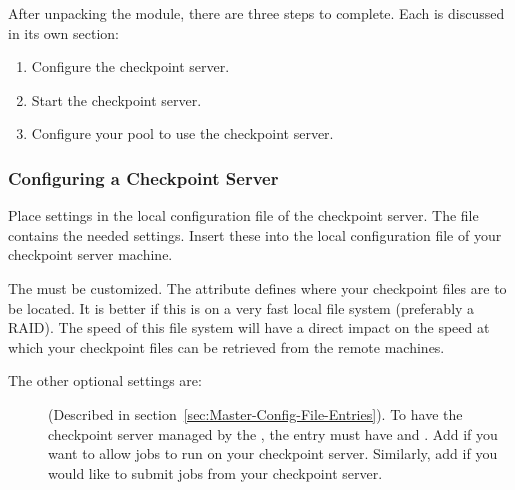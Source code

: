 After unpacking the module, there are three steps
to complete.
Each is discussed in its own section:
\begin{enumerate}
\item Configure the checkpoint server.
\item Start the checkpoint server.
\item Configure your pool to use the checkpoint server.
\end{enumerate}

\subsubsection{\label{sec:Configure-Ckpt-Server}
Configuring a Checkpoint Server} 

Place settings in the local configuration file of
the checkpoint server.
The file  contains
the needed settings. Insert these into the local
configuration file of your checkpoint server machine. 

The   
must be customized.
The  attribute defines where your checkpoint files
are to be located. 
It is better if this is on a very fast local file system (preferably a
RAID). 
The speed of this file system will have a direct impact on the speed
at which your checkpoint files can be retrieved from the remote
machines. 

The other optional settings are:
\begin{description}

\item[] (Described in
section~\ref{sec:Master-Config-File-Entries}).  
To have the checkpoint server managed by the , the
 entry must have  and .
Add  if you want to allow jobs to run on your checkpoint server.
Similarly, add  if you would like to submit jobs from your
checkpoint server. 

\end{description}

